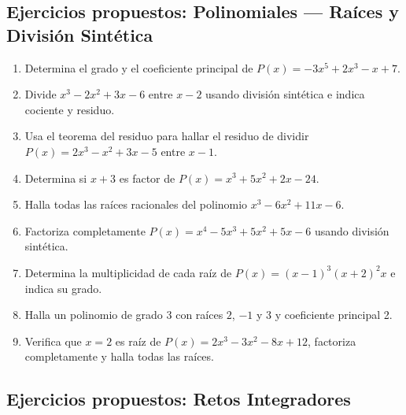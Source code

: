 \documentclass[12pt, letterpaper]{article}
\begin{document}
\subsection{Ejercicios propuestos: Polinomiales — Raíces y División Sintética}

\begin{enumerate}[resume=ejercicios, leftmargin=*]
  \item \facil{} Determina el grado y el coeficiente principal de $P(x) = -3x^5 + 2x^3 - x + 7$.

  \item \facil{} Divide $x^3 - 2x^2 + 3x - 6$ entre $x - 2$ usando división sintética e indica cociente y residuo.

  \item \medio{} Usa el teorema del residuo para hallar el residuo de dividir $P(x) = 2x^3 - x^2 + 3x - 5$ entre $x - 1$.

  \item \medio{} Determina si $x + 3$ es factor de $P(x) = x^3 + 5x^2 + 2x - 24$.

  \item \medio{} Halla todas las raíces racionales del polinomio $x^3 - 6x^2 + 11x - 6$.

  \item \dificil{} Factoriza completamente $P(x) = x^4 - 5x^3 + 5x^2 + 5x - 6$ usando división sintética.

  \item \dificil{} Determina la multiplicidad de cada raíz de $P(x) = (x - 1)^3 (x + 2)^2 x$ e indica su grado.

  \item \dificil{} Halla un polinomio de grado 3 con raíces $2$, $-1$ y $3$ y coeficiente principal 2.

  \item \muyDificil{} Verifica que $x = 2$ es raíz de $P(x) = 2x^3 - 3x^2 - 8x + 12$, factoriza completamente y halla todas las raíces.
\end{enumerate}

\subsection{Ejercicios propuestos: Retos Integradores}
\end{document}

